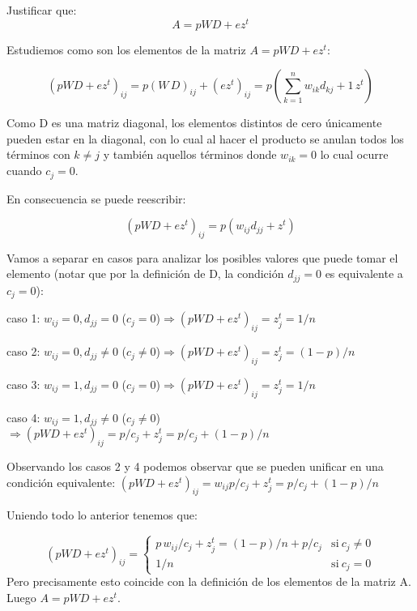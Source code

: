 \documentclass[a4paper]{article}
\begin{document}
Justificar que:
\begin{displaymath}
A = p WD + ez^{t}
\end{displaymath}

Estudiemos como son los elementos de la matriz $A = p WD + ez^{t}$:

\begin{displaymath}
(p WD + ez^{t})_{ij} = p(W\,D)_{ij}+(ez^{t})_{ij} = p(\sum_{k=1}^{n}w_{ik}d_{kj}+1\,z^{t})
\end{displaymath}

Como D es una matriz diagonal, los elementos distintos de cero únicamente pueden estar en la diagonal, con lo cual al hacer el producto se anulan todos los términos con $k\not=j$ y también aquellos términos donde $w_{ik}=0$ lo cual ocurre cuando $c_j=0$.

En consecuencia se puede reescribir:

\begin{displaymath}
(p WD + ez^{t})_{ij} = p(w_{ij}d_{jj}+z^{t})
\end{displaymath}

Vamos a separar en casos para analizar los posibles valores que puede tomar el elemento (notar que por la definición de D, la condición $d_{jj}=0$ es equivalente a $c_j=0$):

caso 1: $w_{ij}=0, d_{jj}=0$ ($c_j=0$)$\Rightarrow(p WD + ez^{t})_{ij} =z_j^t=1/n$


caso 2: $w_{ij}=0, d_{jj}\not=0$ ($c_j\not=0$)$\Rightarrow(p WD + ez^{t})_{ij} =z_j^t=(1-p)/n$


caso 3: $w_{ij}=1, d_{jj}=0$ ($c_j=0$)$\Rightarrow(p WD + ez^{t})_{ij} =z_j^t=1/n$


caso 4: $w_{ij}=1, d_{jj}\not=0$ ($c_j\not=0$)$\Rightarrow(p WD + ez^{t})_{ij} =p/c_j+z_j^t=p/c_j+(1-p)/n$

Observando los casos 2 y 4 podemos observar que se pueden  unificar en una condición equivalente: $(p WD + ez^{t})_{ij} =w_{ij}p/c_j+z_j^t=p/c_j+(1-p)/n$

Uniendo todo lo anterior tenemos que:


\begin{equation}
 (p WD + ez^{t})_{ij} = \left\{
    \begin{array}{ll}
	 p\,w_{ij}/c_j+z_j^t=(1-p)/n+p/c_j & \mathrm{si\ } c_j \not= 0 \\
	 1/n & \mathrm{si\ } c_j=0
	 \end{array}
   \right.
\end{equation}
Pero precisamente esto coincide con la definición de los elementos de la matriz A. Luego $A = p WD + ez^{t}$.
\end{document}
